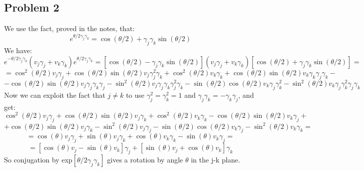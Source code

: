 \documentclass[12 pt]{article}
\begin{document}
\subsection*{Problem 2}
We use the fact, proved in the notes, that:
\[   e^{\theta/2 \gamma_j \gamma_k} = \cos (\theta/2) + \gamma_j \gamma_k \sin(\theta/2)  \]
We have:
\[   e^{-\theta/2 \gamma_j \gamma_k} (v_j \gamma_j + v_k \gamma_k)   e^{\theta/2 \gamma_j \gamma_k} = \left[ \cos (\theta/2) - \gamma_j \gamma_k \sin(\theta/2) \right] (v_j \gamma_j + v_k \gamma_k)   \left[ \cos (\theta/2) + \gamma_j \gamma_k \sin(\theta/2) \right]  = \]
\[  =  \cos^2(\theta/2) v_j \gamma_j  + \cos(\theta/2)\sin(\theta/2) v_j \gamma_j^2 \gamma_k  + \cos^2(\theta/2) v_k \gamma_k  +  \cos(\theta/2)\sin (\theta/2) v_k \gamma_k \gamma_j \gamma_k  -  \]
\[  - \cos(\theta/2)\sin(\theta/2) v_j \gamma_j \gamma_k \gamma_j  - \sin^2(\theta/2) v_j \gamma_j\gamma_k \gamma^2_j \gamma_k  - \sin(\theta/2)\cos(\theta/2) v_k \gamma_j\gamma_k^2  - \sin^2(\theta/2) v_k \gamma_j\gamma_k^2\gamma_j\gamma_k  \]
Now we can exploit the fact that $j\neq k$ to use $\gamma_j^2=\gamma_k^2=1$ and $\gamma_j\gamma_k = -\gamma_k\gamma_j$, and get:
\[  \cos^2(\theta/2) v_j \gamma_j  + \cos(\theta/2)\sin(\theta/2) v_j  \gamma_k  + \cos^2(\theta/2) v_k \gamma_k  -  \cos(\theta/2)\sin (\theta/2) v_k  \gamma_j   +  \]
\[  + \cos(\theta/2)\sin(\theta/2) v_j  \gamma_k  - \sin^2(\theta/2) v_j \gamma_j  - \sin(\theta/2)\cos(\theta/2) v_k \gamma_j - \sin^2(\theta/2) v_k \gamma_k  = \]
\[  = \cos(\theta) v_j\gamma_j + \sin(\theta) v_j\gamma_k  + \cos(\theta) v_k\gamma_k -\sin(\theta) v_k \gamma_j =  \]
\[  = [\cos(\theta) v_j - \sin(\theta) v_k ]\gamma_j + [\sin(\theta) v_j + \cos (\theta)v_k]\gamma_k    \]
So conjugation by exp$[\theta/2 \gamma_j\gamma_k]$ gives a rotation by angle $\theta$ in the j-k plane.
\end{document}
